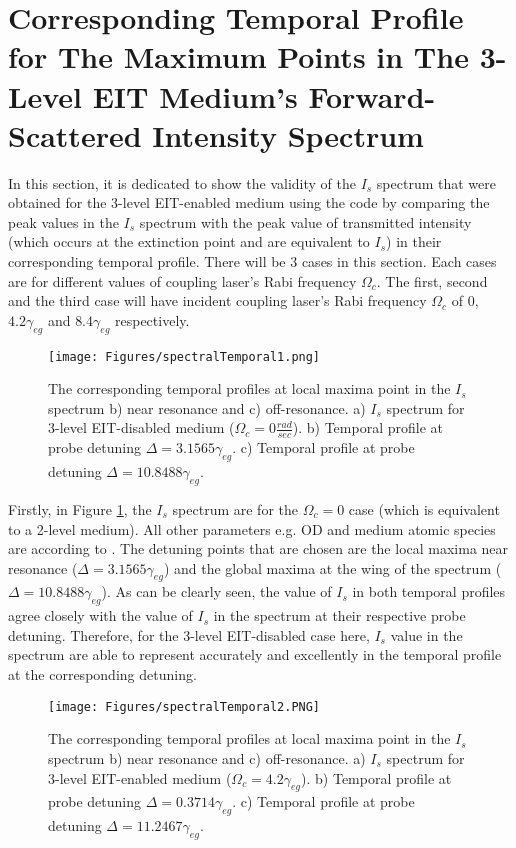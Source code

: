 \section{Corresponding Temporal Profile for The Maximum Points in The 3-Level EIT Medium's Forward-Scattered Intensity Spectrum}
In this section, it is dedicated to show the validity of the $I_{s}$ spectrum that were obtained for the 3-level EIT-enabled medium using the code by comparing the peak values in the $I_{s}$ spectrum with the peak value of transmitted intensity (which occurs at the extinction point and are equivalent to $I_{s}$) in their corresponding temporal profile. There will be 3 cases in this section. Each cases are for different values of coupling laser's Rabi frequency $\Omega_{c}$. The first, second and the third case will have incident coupling laser's Rabi frequency $\Omega_{c}$ of $0$, $4.2\gamma_{eg}$ and $8.4\gamma_{eg}$ respectively.

\begin{figure}[h!]
    \centering
    \texttt{[image: Figures/spectralTemporal1.png]}
    \caption{The corresponding temporal profiles at local maxima point in the $I_{s}$ spectrum b) near resonance and c) off-resonance. a) $I_{s}$ spectrum for 3-level EIT-disabled medium ($\Omega_{c} = 0 \frac{rad}{sec}$). b)  Temporal profile at probe detuning $\Delta = 3.1565\gamma_{eg}$. c) Temporal profile at probe detuning $\Delta = 10.8488\gamma_{eg}$.}
    \label{fig: corresponding temporal profile 1}
\end{figure}

\newpage

Firstly, in Figure \ref{fig: corresponding temporal profile 1}, the $I_{s}$ spectrum are for the $\Omega_{c} = 0$ case (which is equivalent to a 2-level medium). All other parameters e.g. OD and medium atomic species are according to \cite{jeong2010slow}. The detuning points that are chosen are the local maxima near resonance ($\Delta = 3.1565\gamma_{eg}$) and the global maxima at the wing of the spectrum ($\Delta = 10.8488\gamma_{eg}$). As can be clearly seen, the value of $I_{s}$ in both temporal profiles agree closely with the value of $I_{s}$ in the spectrum at their respective probe detuning. Therefore, for the 3-level EIT-disabled case here, $I_{s}$ value in the spectrum are able to represent accurately and excellently in the temporal profile at the corresponding detuning.

\begin{figure}[h!]
    \centering
     \texttt{[image: Figures/spectralTemporal2.PNG]}
    \caption{The corresponding temporal profiles at local maxima point in the $I_{s}$ spectrum b) near resonance and c) off-resonance. a) $I_{s}$ spectrum for 3-level EIT-enabled medium ($\Omega_{c} = 4.2\gamma_{eg}$). b) Temporal profile at probe detuning $\Delta = 0.3714\gamma_{eg}$. c) Temporal profile at probe detuning $\Delta = 11.2467\gamma_{eg}$.}
    \label{fig: corresponding temporal profile 2}
\end{figure}

